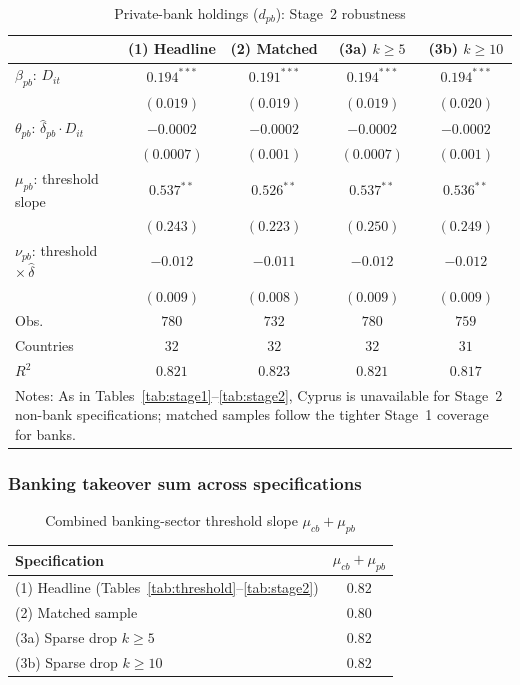 \documentclass[\latexroot/\projectname]{subfiles}
\begin{document}
\begin{table}[htbp]\centering
\caption{Private-bank holdings ($d_{pb}$): Stage~2 robustness}
\label{tab:app-pb}
\setlength{\tabcolsep}{6pt}
\renewcommand{\arraystretch}{1.15}
\begin{tabular}{lcccc}
\toprule
 & (1) Headline & (2) Matched & (3a) $k\!\ge\!5$ & (3b) $k\!\ge\!10$ \\
\midrule
$\beta_{pb}$: $D_{it}$
  & $0.194^{***}$ & $0.191^{***}$ & $0.194^{***}$ & $0.194^{***}$ \\
  & $(0.019)$ & $(0.019)$ & $(0.019)$ & $(0.020)$ \\
$\theta_{pb}$: $\hat\delta_{pb}\!\cdot D_{it}$
  & $-0.0002$ & $-0.0002$ & $-0.0002$ & $-0.0002$ \\
  & $(0.0007)$ & $(0.001)$ & $(0.0007)$ & $(0.001)$ \\
$\mu_{pb}$: threshold slope
  & $0.537^{**}$ & $0.526^{**}$ & $0.537^{**}$ & $0.536^{**}$ \\
  & $(0.243)$ & $(0.223)$ & $(0.250)$ & $(0.249)$ \\
$\nu_{pb}$: threshold $\times\,\hat\delta$
  & $-0.012$ & $-0.011$ & $-0.012$ & $-0.012$ \\
  & $(0.009)$ & $(0.008)$ & $(0.009)$ & $(0.009)$ \\
\midrule
Obs.        & $780$ & $732$ & $780$ & $759$ \\
Countries   & $32$ & $32$ & $32$ & $31$ \\
$R^2$       & $0.821$ & $0.823$ & $0.821$ & $0.817$ \\
\bottomrule
\multicolumn{5}{p{0.9\linewidth}}{\footnotesize Notes: As in Tables~\ref{tab:stage1}--\ref{tab:stage2}, Cyprus is unavailable for Stage~2 non-bank specifications; matched samples follow the tighter Stage~1 coverage for banks.}
\end{tabular}
\end{table}

\subsubsection{Banking takeover sum across specifications}
\whenintegrated{\label{app:banking-sum}}

\begin{table}[htbp]\centering
\caption{Combined banking-sector threshold slope $\mu_{cb}+\mu_{pb}$}
\label{tab:app-musum}
\renewcommand{\arraystretch}{1.10}
\begin{tabular}{lc}
\toprule
Specification & $\mu_{cb}+\mu_{pb}$ \\
\midrule
(1) Headline (Tables~\ref{tab:threshold}--\ref{tab:stage2}) & $0.82$ \\
(2) Matched sample                                         & $0.80$ \\
(3a) Sparse drop $k\!\ge\!5$                              & $0.82$ \\
(3b) Sparse drop $k\!\ge\!10$                             & $0.82$ \\
\bottomrule
\end{tabular}
\end{table}
\end{document}
